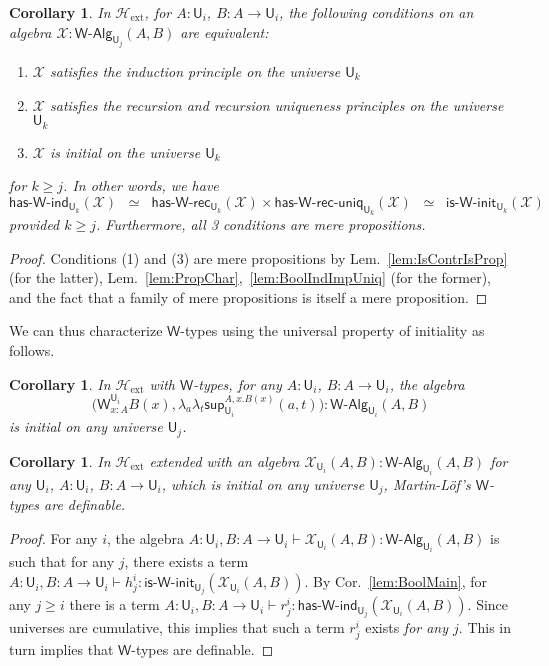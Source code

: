 \documentclass[reqno,10pt,a4paper,oneside]{amsart}
\numberwithin{equation}{section}
\theoremstyle{mythm}
\newtheorem{corollary}[theorem]{Corollary}
\theoremstyle{mydef}
\theoremstyle{myrmk}
\newcommand{\Hext}{\mathcal{H}_{\mathrm{ext}}}
\newcommand{\lam}[1]{\lambda_{#1}}
\newcommand{\W}{\mathsf{W}}
\newcommand{\wsup}{\mathsf{sup}}
\newcommand{\UU}{\mathsf{U}}
\newcommand{\WAlg}{\mathsf{W}\text{-}\mathsf{Alg}}
\newcommand{\HasWRec}{\mathsf{has}\text{-}\mathsf{W}\text{-}\mathsf{rec}}
\newcommand{\HasWInd}{\mathsf{has}\text{-}\mathsf{W}\text{-}\mathsf{ind}}
\newcommand{\HasWRecUniq}{\mathsf{has}\text{-}\mathsf{W}\text{-}\mathsf{rec}\text{-}\mathsf{uniq}}
\newcommand{\IsWInit}{\mathsf{is}\text{-}\mathsf{\W}\text{-}\mathsf{init}}
\newcommand{\X}{\mathcal{X}}
\begin{document}
\begin{corollary}\label{lem:WMain}
In $\Hext$, for $A:\UU_i$, $B : A \to \UU_i$, the following conditions on an algebra $\X : \WAlg_{\UU_j}(A,B)$ are equivalent:
\begin{enumerate}
\item $\X$ satisfies the induction principle on the universe $\UU_k$
\item $\X$ satisfies the recursion and recursion uniqueness principles on the universe $\UU_k$
\item $\X$ is initial on the universe $\UU_k$  
\end{enumerate}
for $k \geq j$. In other words, we have \[ \HasWInd_{\UU_k}(\X)  \;\; \simeq \;\; \HasWRec_{\UU_k}(\X) \times \HasWRecUniq_{\UU_k}(\X) \;\; \simeq \;\; \IsWInit_{\UU_k}(\X) \]
provided $k \geq j$. Furthermore, all 3 conditions are mere propositions.
\end{corollary}
\begin{proof}
Conditions (1) and (3) are mere propositions by Lem.~\ref{lem:IsContrIsProp} (for the latter), Lem.~\ref{lem:PropChar},~\ref{lem:BoolIndImpUniq} (for the former), and the fact that a family of mere propositions is itself a mere proposition.
\end{proof}

We can thus characterize $\W$-types using the universal property of initiality as follows.
\begin{corollary}\label{lem:WInit}
In $\Hext$ with $\W$-types, for any $A:\UU_i$, $B : A \to \UU_i$, the algebra \[\Big(\W^{\UU_i}_{x:A}B(x),\lam{a}\lam{t} \wsup_{\UU_i}^{A,x.B(x)}(a,t) \Big) : \WAlg_{\UU_i}(A,B)\] is initial on any universe $\UU_j$.
\end{corollary}

\begin{corollary}\label{lem:WChar}
In $\Hext$ extended with an algebra $\X_{\UU_i}(A,B) : \WAlg_{\UU_i}(A,B)$ for any $\UU_i$, $A : \UU_i$, $B : A \to \UU_i$, which is initial on any universe $\UU_j$, Martin-L{\"o}f's $\W$-types are definable.
\end{corollary}
\begin{proof}
For any $i$, the algebra $A:\UU_i,B:A\to \UU_i \vdash \X_{\UU_i}(A,B) : \WAlg_{\UU_i}(A,B)$ is such that for any $j$, there exists a term $A:\UU_i,B:A\to \UU_i \vdash h^i_j  : \IsWInit_{\UU_j}(\X_{\UU_i}(A,B))$. By Cor.~\ref{lem:BoolMain}, for any $j \geq i$ there is a term $A:\UU_i,B:A\to \UU_i \vdash r^i_j : \HasWInd_{\UU_j}(\X_{\UU_i}(A,B))$. Since universes are cumulative, this implies that such a term $r^i_j$ exists \emph{for any $j$}. This in turn implies that $\W$-types are definable.
\end{proof}
\end{document}

